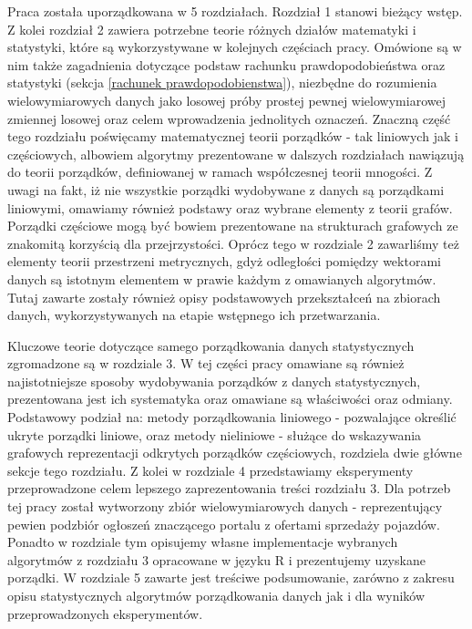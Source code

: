 \documentclass[12pt,a4paper]{report}
\begin{document}
Praca została uporządkowana w 5 rozdziałach. Rozdział 1 stanowi bieżący wstęp. Z kolei rozdział 2 zawiera potrzebne teorie różnych działów matematyki i statystyki, które są wykorzystywane w kolejnych częściach pracy. Omówione są w nim także zagadnienia dotyczące podstaw rachunku prawdopodobieństwa oraz statystyki (sekcja \ref{rachunek prawdopodobienstwa}), niezbędne do rozumienia wielowymiarowych danych jako losowej próby prostej pewnej wielowymiarowej zmiennej losowej oraz celem wprowadzenia jednolitych oznaczeń. Znaczną część tego rozdziału poświęcamy matematycznej teorii porządków - tak liniowych jak i częściowych, albowiem algorytmy prezentowane w dalszych rozdziałach nawiązują do teorii porządków, definiowanej w ramach współczesnej teorii mnogości. Z uwagi na fakt, iż nie wszystkie porządki wydobywane z danych są porządkami liniowymi, omawiamy również podstawy oraz wybrane elementy z teorii grafów. Porządki częściowe mogą być bowiem prezentowane na strukturach grafowych ze znakomitą korzyścią dla przejrzystości. Oprócz tego w rozdziale 2 zawarliśmy też elementy teorii przestrzeni metrycznych, gdyż odległości pomiędzy wektorami danych są istotnym elementem w prawie każdym z omawianych algorytmów. Tutaj zawarte zostały również opisy podstawowych przekształceń na zbiorach danych, wykorzystywanych na etapie wstępnego ich przetwarzania.

Kluczowe teorie dotyczące samego porządkowania danych statystycznych zgromadzone są w rozdziale 3. W tej części pracy omawiane są również najistotniejsze sposoby wydobywania porządków z danych statystycznych, prezentowana jest ich systematyka oraz omawiane są właściwości oraz odmiany. Podstawowy podział na: metody porządkowania liniowego - pozwalające określić ukryte porządki liniowe, oraz metody nieliniowe - służące do wskazywania grafowych reprezentacji odkrytych porządków częściowych, rozdziela dwie główne sekcje tego rozdziału. Z kolei w rozdziale 4 przedstawiamy eksperymenty przeprowadzone celem lepszego zaprezentowania treści rozdziału 3. Dla potrzeb tej pracy został wytworzony zbiór wielowymiarowych danych - reprezentujący pewien podzbiór ogłoszeń znaczącego portalu z ofertami sprzedaży pojazdów. Ponadto w rozdziale tym opisujemy własne implementacje wybranych algorytmów z rozdziału 3 opracowane w języku R i prezentujemy uzyskane porządki. W rozdziale 5 zawarte jest treściwe podsumowanie, zarówno z zakresu opisu statystycznych algorytmów porządkowania danych jak i dla wyników przeprowadzonych eksperymentów.
\end{document}
